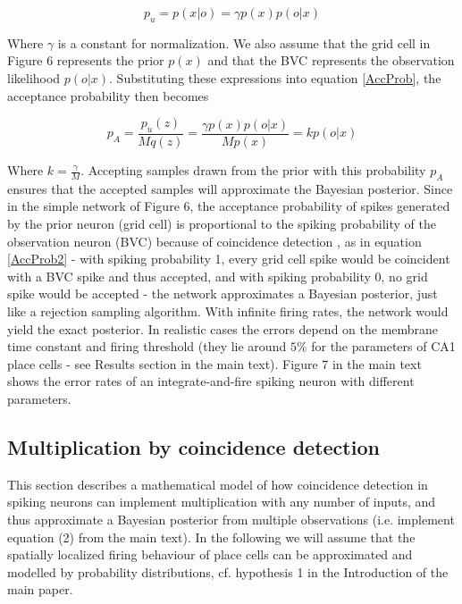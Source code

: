 \begin{equation}\label{Papprox}
p_u = p(x|o) = \gamma p(x) p(o|x)
\end{equation}

Where $\gamma$ is a constant for normalization. We also assume that the grid cell in Figure 6 represents the prior $p(x)$ and that the BVC represents the observation likelihood $ p(o|x) $. Substituting these expressions into equation \eqref{AccProb}, the acceptance probability then becomes

\begin{equation}\label{AccProb2}
p_A=\frac{p_u(z)}{Mq(z)}=\frac{\gamma p(x) p(o|x)}{Mp(x)}=k p(o|x)
\end{equation}

Where $k=\frac{\gamma}{M}$. Accepting samples drawn from the prior with this probability $ p_A $ ensures that the accepted samples will approximate the Bayesian posterior. Since in the simple network of Figure 6, the acceptance probability of spikes generated by the prior neuron (grid cell) is proportional to the spiking probability of the observation neuron (BVC) because of coincidence detection \cite{Rossant2011}, as in equation \eqref{AccProb2} - with spiking probability 1, every grid cell spike would be coincident with a BVC spike and thus accepted, and with spiking probability 0, no grid spike would be accepted - the network approximates a Bayesian posterior, just like a rejection sampling algorithm. With infinite firing rates, the network would yield the exact posterior. In realistic cases the errors depend on the membrane time constant and firing threshold (they lie around $5\%$ for the parameters of CA1 place cells - see Results section in the main text). Figure 7 in the main text shows the error rates of an integrate-and-fire spiking neuron with different parameters.

\subsection*{Multiplication by coincidence detection}

This section describes a mathematical model of how coincidence detection in spiking neurons can implement multiplication with any number of inputs, and thus approximate a Bayesian posterior from multiple observations (i.e. implement equation (2) from the main text). In the following we will assume that the spatially localized firing behaviour of place cells can be approximated and modelled by probability distributions, cf. hypothesis 1 in the Introduction of the main paper. 

